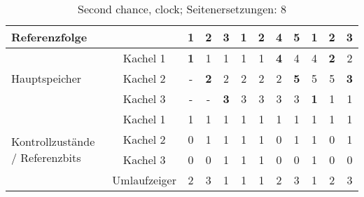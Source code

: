 \documentclass[DIN, pagenumber=false, fontsize=11pt, parskip=half]{scrartcl}
\begin{document}
    \begin{table}[H]
        \centering
        \begin{tabular}{lc|c|c|c|c|c|c|c|c|c|c}
            \toprule
            Referenzfolge & & 1 & 2 & 3 & 1 & 2 & 4 & 5 & 1 & 2 & 3 \\
            \midrule
            \multirow{3}{*}{Hauptspeicher} & Kachel 1 & \textbf{1} & 1 & 1 & 1 & 1 & \textbf{4} & 4 & 4 & \textbf{2} & 2\\
            & Kachel 2 & - & \textbf{2} & 2 & 2 & 2 & 2 & \textbf{5} & 5 & 5 & \textbf{3}\\
            & Kachel 3 & - & - & \textbf{3} & 3 & 3 & 3 & 3 & \textbf{1} & 1 & 1\\
            \midrule
            \multirow{4}{3cm}{Kontrollzustände / Referenzbits} & Kachel 1 & 1 & 1 & 1 & 1 & 1 & 1 & 1 & 1 & 1 & 1\\
            & Kachel 2 & 0 & 1 & 1 & 1 & 1 & 0 & 1 & 1 & 0 & 1\\
            & Kachel 3 & 0 & 0 & 1 & 1 & 1 & 0 & 0 & 1 & 0 & 0\\
            & Umlaufzeiger & 2 & 3 & 1 & 1 & 1 & 2 & 3 & 1 & 2 & 3\\
            \bottomrule
        \end{tabular}
        \caption{Second chance, clock; Seitenersetzungen: 8}
    \end{table}
\end{document}
